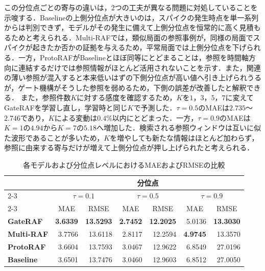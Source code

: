\documentclass[twocolumn, lastpage]{jarticle}
\newif\ifrevmark
\newcommand{\revA}[1]{\ifrevmark{\color{blue}#1}\else#1\fi}
\begin{document}
この分位点ごとの寄与の違いは，2つの工夫が異なる問題に対処していることを示唆する．Baselineの上側分位点が大きいのは，スパイクの発生時点を単一系列からは判別できず，モデルがその発生に備えて上側分位点を恒常的に高く見積もるためと考えられる．Multi-RAFでは，類似局面の参照事例が，同様の局面でスパイクが起きたか否かの証拠を与えるため，平常局面では上側分位点を下げられる．一方，ProtoRAFがBaselineとほぼ同等にとどまることは，参照を時間軸方向に連結するだけでは参照情報がほとんど活用されないことを示す．また，関連の薄い参照が混入すると本来低いはずの下側分位点が高い値へ引き上げられうるが，ゲート機構がそうした参照を弱めるため，下側の誤差が改善したと解釈できる．
\revA{また，参照件数$K$に対する感度を確認するため，$K$を$1$，$3$，$5$，$7$に変えてGateRAFを学習し直し，学習時と同じ$K$で予測した．$\tau=0.5$のMAEは$2.735$〜$2.746$であり，$K$による変動は$0.4\%$以内にとどまった．一方，$\tau=0.9$のMAEは$K=1$の$4.94$から$K=7$の$5.18$へ増加した．検索される参照ウィンドウは互いに似た波形であることが多いため，$K$を増やしても新たな情報はほとんど加わらず，参照に由来する寄与だけが増えて上側分位点が押し上げられたと考えられる．}
    \begin{table}[t]
        \caption{各モデルおよび分位点レベルにおけるMAEおよびRMSEの比較}
        \label{tab:metric_comparison}
        \centering
        \begin{tabular}{lrrrrrr}
            \hline
            & \multicolumn{6}{c}{分位点} \\
            \cline{2-3} \cline{4-5} \cline{6-7}
            \multicolumn{1}{c}{モデル} & \multicolumn{2}{c}{$\tau=0.1$} & \multicolumn{2}{c}{$\tau=0.5$} & \multicolumn{2}{c}{$\tau=0.9$} \\
            \cline{2-3} \cline{4-5} \cline{6-7}
            & \multicolumn{1}{c}{MAE} & \multicolumn{1}{c}{RMSE} & \multicolumn{1}{c}{MAE} & \multicolumn{1}{c}{RMSE} & \multicolumn{1}{c}{MAE} & \multicolumn{1}{c}{RMSE} \\
            \hline\hline
            \textbf{GateRAF} & \textbf{3.6339} & \textbf{13.5293} & \textbf{2.7452} & \textbf{12.2025} & 5.0136 & \textbf{13.3030} \\
            \textbf{Multi-RAF} & 3.7766 & 13.6118 & 2.8117 & 12.2594 & \textbf{4.9745} & 13.3570 \\
            \textbf{ProtoRAF} & 3.6604 & 13.7593 & 3.0467 & 12.9622 & 6.8549 & 27.0196 \\
            \textbf{Baseline} & 3.6501 & 13.7476 & 3.0460 & 12.9603 & 6.8512 & 27.0050 \\
            \hline
        \end{tabular}
    \end{table}
\end{document}
